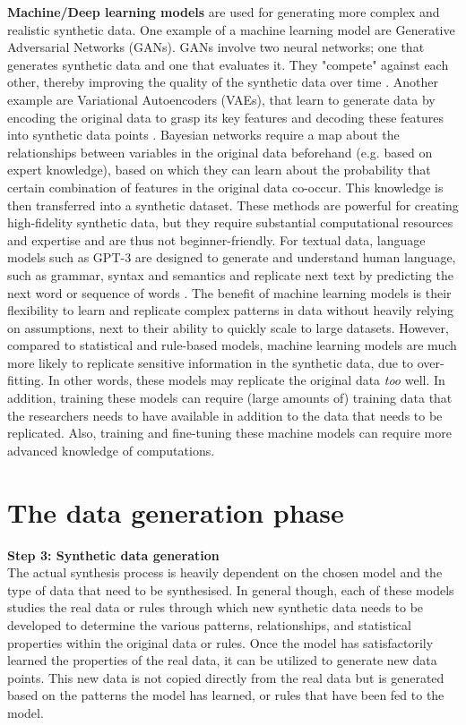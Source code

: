 \textbf{Machine/Deep learning models} are used for generating more complex and realistic synthetic data. One example of a machine learning model are Generative Adversarial Networks (GANs). GANs involve two neural networks; one that generates synthetic data and one that evaluates it. They "compete" against each other, thereby improving the quality of the synthetic data over time \cite{wang2017generative}. Another example are Variational Autoencoders (VAEs), that learn to generate data by encoding the original data to grasp its key features and decoding these features into synthetic data points \cite{doersch2016tutorial,wan2017variational}. Bayesian networks require a map about the relationships between variables in the original data beforehand (e.g. based on expert knowledge), based on which they can learn about the probability that certain combination of features in the original data co-occur. This knowledge is then transferred into a synthetic dataset. These methods are powerful for creating high-fidelity synthetic data, but they require substantial computational resources and expertise and are thus not beginner-friendly. For textual data, language models such as GPT-3 are designed to generate and understand human language, such as grammar, syntax and semantics and replicate next text by predicting the next word or sequence of words \cite{li2023synthetic}. The benefit of machine learning models is their flexibility to learn and replicate complex patterns in data without heavily relying on assumptions, next to their ability to quickly scale to large datasets. However, compared to statistical and rule-based models, machine learning models are much more likely to replicate sensitive information in the synthetic data, due to over-fitting. In other words, these models may replicate the original data \textit{too} well. In addition, training these models can require (large amounts of) training data that the researchers needs to have available in addition to the data that needs to be replicated. Also, training and fine-tuning these machine models can require more advanced knowledge of computations.



\section{The data generation phase}


\textbf{Step 3: Synthetic data generation} \\
The actual synthesis process is heavily dependent on the chosen model and the type of data that need to be synthesised. In general though, each of these models studies the real data or rules through which new synthetic data needs to be developed to determine the various patterns, relationships, and statistical properties within the original data or rules. 
Once the model has satisfactorily learned the properties of the real data, it can be utilized to generate new data points. This new data is not copied directly from the real data but is generated based on the patterns the model has learned, or rules that have been fed to the model. 

